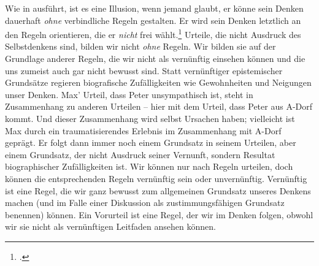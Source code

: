 Wie  in 
ausführt, ist es eine Illusion, wenn jemand glaubt, er könne sein Denken
dauerhaft \emph{ohne} verbindliche Regeln gestalten. Er wird sein Denken
letztlich an den Regeln orientieren, die er \emph{nicht} frei
wählt.\footnote{\cite[Vgl.][A
327\,f.,]{Kant:Washeisst:SichimDenkenorientieren?1977}
\cite[][VIII: 145.6--35]{Kant:GesammelteWerke1900ff.}.} Urteile, die nicht
Ausdruck des Selbstdenkens sind, bilden wir nicht \emph{ohne} Regeln. Wir bilden
sie auf der Grundlage anderer Regeln, die wir nicht als vernünftig einsehen
können und die uns zumeist auch gar nicht bewusst sind.
Statt vernünftiger epistemischer Grundsätze regieren biografische Zufälligkeiten
wie Gewohnheiten und Neigungen unser Denken. Max' Urteil, dass Peter
unsympathisch ist, steht in Zusammenhang zu anderen Urteilen -- hier mit dem
Urteil, dass Peter aus A-Dorf kommt.
Und dieser Zusammenhang wird selbst Ursachen haben; vielleicht ist Max durch ein
traumatisierendes Erlebnis im Zusammenhang mit A-Dorf geprägt. Er folgt dann
immer noch einem Grundsatz in seinem Urteilen, aber einem Grundsatz, der nicht
Ausdruck seiner Vernunft, sondern Resultat biographischer Zufälligkeiten ist.
Wir können nur nach Regeln urteilen, doch können die entsprechenden Regeln
vernünftig sein oder unvernünftig. Vernünftig ist eine Regel, die wir ganz
bewusst zum allgemeinen Grundsatz unseres Denkens machen (und im Falle einer
Diskussion als zustimmungsfähigen Grundsatz benennen) können. Ein Vorurteil ist
eine Regel, der wir im Denken folgen, obwohl wir sie nicht als vernünftigen
Leitfaden ansehen können.

